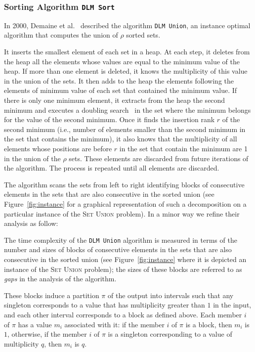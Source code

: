 \subsubsection{Sorting Algorithm \texttt{DLM
    Sort}}
\label{sec:dlm-sort}

In 2000, Demaine et
al.~\cite{2000-SODA-AdaptiveSetIntersectionsUnionsAndDifferences-DemaineLopezOrtizMunro}
described the algorithm \texttt{DLM Union}, an instance optimal algorithm that
computes the union of $\rho$ sorted sets.
\begin{LONG}
  It inserts the smallest element of each set in a heap. At each step,
  it deletes from the heap all the elements whose values are equal to
  the minimum value of the heap. If more than one element is deleted,
  it knows the multiplicity of this value in the union of the sets. It
  then adds to the heap the elements following the elements of minimum
  value of each set that contained the minimum value. If there is only
  one minimum element, it extracts from the heap the second minimum
  and executes a doubling
  search~\cite{1976-IPL-AnAlmostOptimalAlgorithmForUnboundedSearching-BentleyYao}
  in the set where the minimum belongs for the value of the second
  minimum. Once it finds the insertion rank $r$ of the second minimum
  (i.e., number of elements smaller than the second minimum in the set
  that contains the minimum), it also knows that the multiplicity of
  all elements whose positions are before $r$ in the set that contain
  the minimum are 1 in the union of the $\rho$ sets. These
    elements are discarded from future iterations of the
    algorithm. The process is repeated until all elements
  are discarded.
\end{LONG}\begin{SHORT}The algorithm scans the sets from left to right identifying blocks of
  consecutive elements in the sets that are also consecutive in the
  sorted union (see Figure~\ref{fig:instance} for a graphical
  representation of such a decomposition on a particular
  instance of the \textsc{Set Union} problem). In a minor way we refine their analysis as follow:
  
\end{SHORT}
\begin{LONG}
  
The time complexity of the \texttt{DLM Union} algorithm is measured in terms of the number and sizes of blocks of consecutive elements in the sets that are also consecutive in the sorted union (see Figure~\ref{fig:instance} where it is depicted an instance of the \textsc{Set Union} problem); the sizes of these blocks are referred to as \emph{gaps} in the analysis of the algorithm.\end{LONG} These blocks induce a partition $\pi$ of the output into intervals such that any singleton corresponds to a value that has multiplicity greater than $1$ in the input, and each other interval corresponds to a block as defined above. Each member $i$ of $\pi$ has a value $m_i$ associated with it: if the member $i$ of $\pi$ is a block, then $m_i$ is $1$, otherwise, if the member $i$ of $\pi$ is a singleton corresponding to a value of multiplicity $q$, then $m_i$ is $q$.
